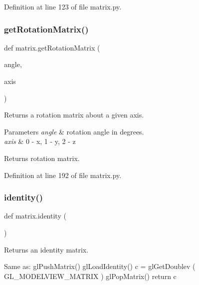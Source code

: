 Definition at line 123 of file matrix.\+py.

\mbox{\label{namespacematrix_ade61e3d860067b059336746b261edb3c}} 
\subsubsection{\texorpdfstring{get\+Rotation\+Matrix()}{getRotationMatrix()}}
{\footnotesize\ttfamily def matrix.\+get\+Rotation\+Matrix (\begin{DoxyParamCaption}\item[{}]{angle,  }\item[{}]{axis }\end{DoxyParamCaption})}



Returns a rotation matrix about a given axis. 


\begin{DoxyParams}{Parameters}
{\em angle} & rotation angle in degrees. \\
\hline
{\em axis} & 0 -\/ x, 1 -\/ y, 2 -\/ z \\
\hline
\end{DoxyParams}
\begin{DoxyReturn}{Returns}
rotation matrix. 
\end{DoxyReturn}


Definition at line 192 of file matrix.\+py.

\mbox{\label{namespacematrix_a3e5c0f4bcc7655342814615fa5b4bc0d}} 
\subsubsection{\texorpdfstring{identity()}{identity()}}
{\footnotesize\ttfamily def matrix.\+identity (\begin{DoxyParamCaption}{ }\end{DoxyParamCaption})}



Returns an identity matrix. 

Same as\+: gl\+Push\+Matrix() gl\+Load\+Identity() c = gl\+Get\+Doublev ( G\+L\+\_\+\+M\+O\+D\+E\+L\+V\+I\+E\+W\+\_\+\+M\+A\+T\+R\+IX ) gl\+Pop\+Matrix() return c

